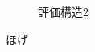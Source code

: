 \documentclass[syuuron]{kuee}
\begin{document}
		\begin{figure}
			\begin{center}
			\end{center}
			\caption{評価構造2}
	  		\label{fig:es3}
		\end{figure}


\begin{acknowledgements}
	ほげ
\end{acknowledgements}
\end{document}
